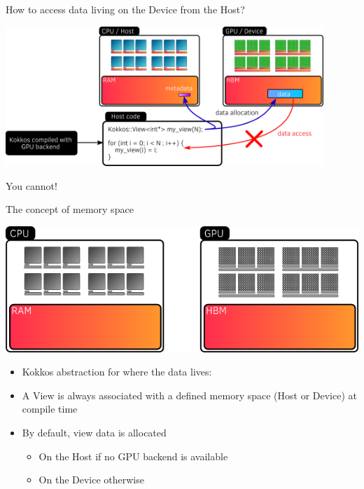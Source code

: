 \documentclass[aspectratio=169]{beamer}
\begin{document}

\begin{frame}{How to access data living on the Device from the Host?}
    \begin{center}
        \includegraphics[width=0.9\textwidth]{device_memory_access.png}
    \end{center}

     You cannot!
\end{frame}


\begin{frame}{The concept of memory space}
    \begin{center}
        \includegraphics[width=0.7\linewidth]{memory_space.png}
    \end{center}
    \begin{itemize}
        \item Kokkos abstraction for where the data lives: 
        \item A View is always associated with a defined memory space (Host or Device) at compile time
        \item By default, view data is allocated
        \begin{itemize}
            \item On the Host if no GPU backend is available
            \item On the Device otherwise
        \end{itemize}
    \end{itemize}
\end{frame}
\end{document}
